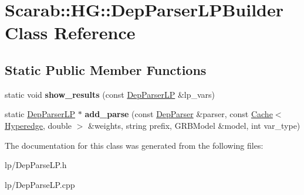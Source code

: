 \hypertarget{class_scarab_1_1_h_g_1_1_dep_parser_l_p_builder}{
\section{Scarab::HG::DepParserLPBuilder Class Reference}
\label{class_scarab_1_1_h_g_1_1_dep_parser_l_p_builder}
}
\subsection*{Static Public Member Functions}
\begin{DoxyCompactItemize}
\item 
\hypertarget{class_scarab_1_1_h_g_1_1_dep_parser_l_p_builder_a8864b215a93fa51c4df30669dacb0ddc}{
static void {\bfseries show\_\-results} (const \hyperlink{struct_scarab_1_1_h_g_1_1_dep_parser_l_p}{DepParserLP} \&lp\_\-vars)}
\label{class_scarab_1_1_h_g_1_1_dep_parser_l_p_builder_a8864b215a93fa51c4df30669dacb0ddc}

\item 
\hypertarget{class_scarab_1_1_h_g_1_1_dep_parser_l_p_builder_a862127f9347f244103941a119747b810}{
static \hyperlink{struct_scarab_1_1_h_g_1_1_dep_parser_l_p}{DepParserLP} $\ast$ {\bfseries add\_\-parse} (const \hyperlink{class_dep_parser}{DepParser} \&parser, const \hyperlink{class_cache}{Cache}$<$ \hyperlink{class_scarab_1_1_h_g_1_1_hyperedge}{Hyperedge}, double $>$ \&weights, string prefix, GRBModel \&model, int var\_\-type)}
\label{class_scarab_1_1_h_g_1_1_dep_parser_l_p_builder_a862127f9347f244103941a119747b810}

\end{DoxyCompactItemize}


The documentation for this class was generated from the following files:\begin{DoxyCompactItemize}
\item 
lp/DepParseLP.h\item 
lp/DepParseLP.cpp\end{DoxyCompactItemize}
